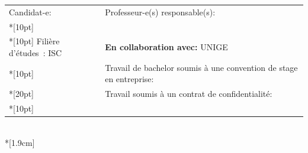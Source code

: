\begin{spacing}{0.956}
\begin{center}
{
	\begin{tabular*}{16cm}{p{7.59cm} p{7.58cm}}
		\small Candidat-e:					&	\small Professeur-e(s) responsable(s):\\*[10pt]
		\small\textbf{\textsc{\Author}}		&	\small\textbf{\textsc{\Professor}}\\*[10pt]
		\footnotesize  Filière d’études : ISC	&	\footnotesize  \textbf{En collaboration avec:} UNIGE\\*[10pt]
		\footnotesize  {} & \footnotesize  Travail de bachelor soumis à une convention de stage en entreprise: \Convention\\*[20pt]
		\footnotesize  {} & \footnotesize  Travail soumis à un contrat de confidentialité: \Confidentiel\\*[10pt]
	\end{tabular*}\\*[1.9cm]
}

\end{center}
\end{spacing}
          
